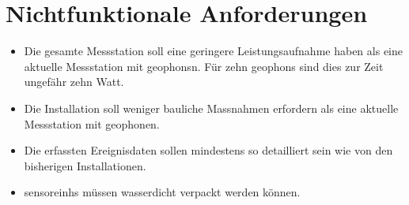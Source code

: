 %
%

\thispagestyle{empty}
\chapter{Nichtfunktionale Anforderungen}\label{chap.nichtfunktionale}

\begin{itemize}
\item Die gesamte Messstation soll eine geringere Leistungsaufnahme haben als eine aktuelle Messstation mit \glspl{geophon}n. Für zehn \glspl{geophon} sind dies zur Zeit ungefähr zehn Watt.

\item Die Installation soll weniger bauliche Massnahmen erfordern als eine aktuelle Messstation mit \gls{geophon}en.

\item Die erfassten Ereignisdaten sollen mindestens so detailliert sein wie von den bisherigen Installationen.

\item \glspl{sensoreinh} müssen wasserdicht verpackt werden können.
\
\end{itemize}